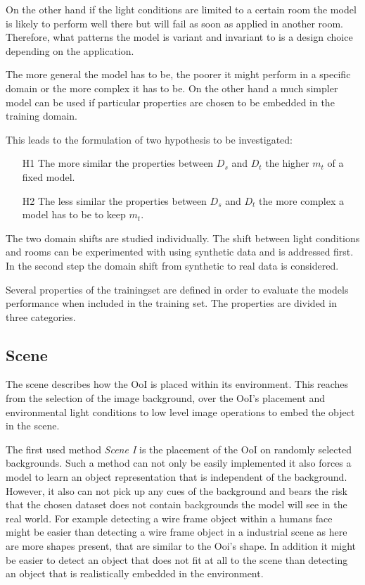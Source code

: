 On the other hand if the light conditions are limited to a certain room the model is likely to perform well there but will fail as soon as applied in another room. Therefore, what patterns the model is variant and invariant to is a design choice depending on the application.

The more general the model has to be, the poorer it might perform in a specific domain or the more complex it has to be. On the other hand a much simpler model can be used if particular properties are chosen to be embedded in the training domain. 

This leads to the formulation of two hypothesis to be investigated:

\begin{enumerate}
	\item[H1] The more similar the properties between $D_s$ and $D_t$ the higher $m_t$ of a fixed model.
	\item[H2] The less similar the properties between $D_s$ and $D_t$ the more complex a model has to be to keep $m_t$.
\end{enumerate}

The two domain shifts are studied individually. The shift between light conditions and rooms can be experimented with using synthetic data and is addressed first. In the second step the domain shift from synthetic to real data is considered. 

Several properties of the trainingset are defined in order to evaluate the models performance when included in the training set. The properties are divided in three categories.

\subsection{Scene}

The scene describes how the \ac{OoI} is placed within its environment. This reaches from the selection of the image background, over the \ac{OoI}'s placement and environmental light conditions to low level image operations to embed the object in the scene.

The first used method \textit{Scene I} is the placement of the \ac{OoI} on randomly selected backgrounds. Such a method can not only be easily implemented it also forces a model to learn an object representation that is independent of the background. However, it also can not pick up any cues of the background and bears the risk that the chosen dataset does not contain backgrounds the model will see in the real world. For example detecting a wire frame object within a humans face might be easier than detecting a wire frame object in a industrial scene as here are more shapes present, that are similar to the \ac{Ooi}'s shape. In addition it might be easier to detect an object that does not fit at all to the scene than detecting an object that is realistically embedded in the environment.


